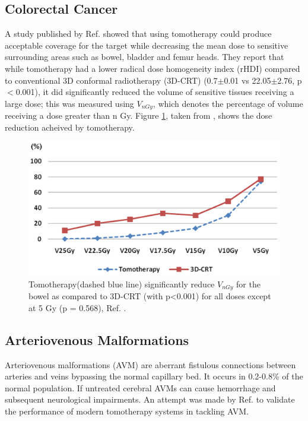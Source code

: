 \documentclass[10pt,journal,compsoc]{IEEEtran} %
\begin{document}
  \subsection{Colorectal Cancer}
  A study published by Ref. \cite{Yu2013} showed that using 
  tomotherapy 
  could produce acceptable coverage for the target while decreasing 
  the mean dose to sensitive surrounding areas such as bowel, bladder 
  and femur heads. They report that while tomotherapy had a  lower 
  radical 
  dose homogeneity index (rHDI) compared to conventional 3D conformal 
  radiotherapy (3D-CRT) (0.7$\pm$0.01 vs 22.05$\pm$2.76, p$<$0.001),  
  it did significantly reduced the volume of sensitive tissues 
  receiving a large dose; this was measured using $V_{nGy}$, which 
  denotes the percentage of volume receiving a dose greater than n 
  Gy. Figure \ref{fig6}, taken from \cite{Yu2013}, shows the dose 
  reduction 
  acheived by tomotherapy.
  \begin{figure}[t]
		\centering
    \includegraphics[width=\linewidth]{fig9.png}
    \caption{Tomotherapy(dashed blue line) significantly reduce 
    $V_{nGy}$ for the bowel as compared to 3D-CRT (with p<0.001) for 
    all doses except at 5 Gy (p = 0.568), Ref. \cite{Yu2013}.}
  	\label{fig6}
  \end{figure}
  
  \subsection{Arteriovenous Malformations}
  Arteriovenous malformations (AVM) are aberrant fistulous connections between 
  arteries and veins bypassing the normal capillary bed. It occurs in 0.2-0.8\% 
  of the normal population. If untreated cerebral AVMs can cause hemorrhage and 
  subsequent neurological impairments. An attempt was made by Ref. 
  \cite{Krause2013} to 
  validate the performance of modern tomotherapy systems in tackling AVM. 
  
\end{document}
